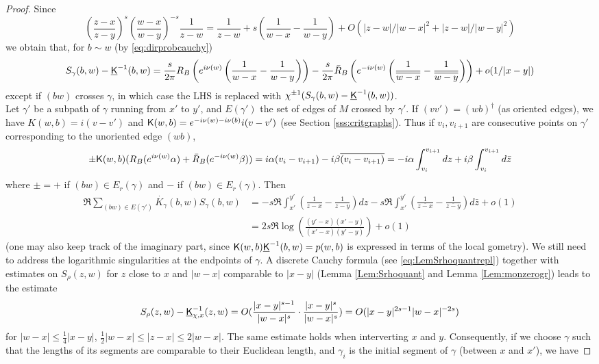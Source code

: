 \documentclass[10pt]{article}
\newcommand{\rK}{{\sf K}}
\newcommand{\uK}{{\underline {\sf K}}}
\newcommand{\dg}{\dagger}
\begin{document}
\begin{proof}
Since
$$\left(\frac{z-x}{z-y}\right)^s\left(\frac{w-x}{w-y}\right)^{-s}\frac{1}{z-w}=\frac{1}{z-w}+s\left(\frac 1{w-x}-\frac 1{w-y}\right)+O(|z-w|/|w-x|^2+|z-w|/|w-y|^2)$$ 
we obtain that, for $b\sim w$ (by \eqref{eq:dirprobcauchy})
\begin{equation}\label{eq:Sgammadiag}
S_\gamma(b,w)-\uK^{-1}(b,w)=\frac{s}{2\pi} R_B\left(e^{i\nu(w)}\left(\frac{1}{w-x}-\frac{1}{w-y}\right)\right)-\frac{s}{2\pi}\bar R_B\left(e^{-i\nu(w)}\left(\frac{1}{\overline{w-x}}-\frac{1}{\overline{w-y}}\right)\right)+o(1/|x-y|)
\end{equation}
except if $(bw)$ crosses $\gamma$, in which case the LHS is replaced with $\chi^{\pm 1}(S_\gamma(b,w)-\uK^{-1}(b,w))$.\\
Let $\gamma'$ be a subpath of $\gamma$ running from $x'$ to $y'$, and $E(\gamma')$ the set of edges of $M$ crossed by $\gamma'$. If $(vv')=(wb)^\dg$ (as oriented edges), we have $K(w,b)=i(v-v')$ and $\rK(w,b)=e^{-i\nu(w)-i\nu(b)}i(v-v')$ (see Section \ref{sss:critgraphs}). Thus if $v_i,v_{i+1}$ are consecutive points on $\gamma'$ corresponding to the unoriented edge $(wb)$,
$$\pm \rK(w,b)(R_B(e^{i\nu(w)}\alpha)+\bar R_B(e^{-i\nu(w)}\beta))=
i\alpha(v_i-v_{i+1})-i\beta\overline{(v_i-v_{i+1})}=
-i\alpha\int_{v_i}^{v_{i+1}}dz+i\beta\int_{v_i}^{v_{i+1}}d\bar z$$
where $\pm=+$ if $(bw)\in E_r(\gamma)$ and $-$ if $(bw)\in E_r(\gamma)$. Then
\begin{align*}
\Re\sum_{(bw)\in E(\gamma')}\dot{K_\gamma}(b,w)S_\gamma(b,w)&=-s\Re\int_{x'}^{y'}\left(\frac{1}{z-x}-\frac{1}{z-y}\right)dz-s\Re\int_{x'}^{y'}\left(\frac{1}{\overline{z-x}}-\frac{1}{\overline{z-y}}\right)d\bar z+o(1)\\
&=2s\Re\log\left(\frac{(y'-x)(x'-y)}{(x'-x)(y'-y)}\right)+o(1)
\end{align*}
(one may also keep track of the imaginary part, since $\rK(w,b)\uK^{-1}(b,w)=p(w,b)$ is expressed in terms of the local gometry). We still need to address the logarithmic singularities at the endpoints of $\gamma$. A discrete Cauchy formula (see \eqref{eq:LemSrhoquantrepl}) together with estimates on $S_\rho(z,w)$ for $z$ close to $x$ and $|w-x|$ comparable to $|x-y|$ (Lemma \ref{Lem:Srhoquant} and Lemma \ref{Lem:monzerogr}) leads to the estimate
$$S_\rho(z,w)-\uK^{-1}_{\chi,x}(z,w)=O(\frac{|x-y|^{s-1}}{|w-x|^s}\cdot\frac{|x-y|^s}{|w-x|^s})=O(|x-y|^{2s-1}|w-x|^{-2s})$$
for $|w-x|\leq \frac 14|x-y|$, $\frac 12|w-x|\leq |z-x|\leq 2|w-x|$. The same estimate holds when interverting $x$ and $y$. Consequently, if we choose $\gamma$ such that the lengths of its segments are comparable to their Euclidean length, and $\gamma_i$ is the initial segment of $\gamma$ (between $x$ and $x'$), we have

\end{proof}
\end{document}
